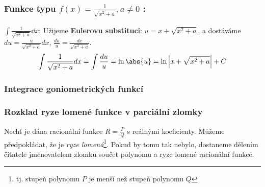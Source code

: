       \subsubsection*{Funkce typu $\boxed{f(x)=\frac{1}{\sqrt{x^2+a}}}, a\neq0$ :}
         \begin{example}\label{ma:ex_sub_metoda1}
           \(\int\frac{1}{\sqrt{x^2+a}}\dd{x}\):\vskip0.5mm
           Užijeme \textbf{Eulerovu substituci}: \(u=x+\sqrt{x^2+a}\), a dostáváme
           \(du=\frac{u}{\sqrt{x^2+a}}dx\), \(\frac{du}{u}=\frac{dx}{\sqrt{x^2+a}}\).
           \begin{equation*}
             \int{\frac{1}{\sqrt{x^2+a}}dx}=\int{\frac{du}{u}}=\ln\abs{u}
                                           =\ln\left\lvert x+\sqrt{x^2+a}\right\rvert+C
           \end{equation*}
         \end{example}
  
    \subsubsection{Integrace goniometrických funkcí}
      
    \subsubsection{Rozklad ryze lomené funkce v parciální zlomky}
      Nechť je dána racionální funkce $R = \frac{P}{Q}$ s reálnými koeficienty. Můžeme
      předpokládat, že je \emph{ryze lomená}\footnote{tj. stupeň polynomu $P$ je menší než
      stupeň polynomu $Q$}. Pokud by tomu tak nebylo, dostaneme dělením čitatele jmenovatelem
      zlomku součet polynomu a ryze lomené racionální funkce.
      
